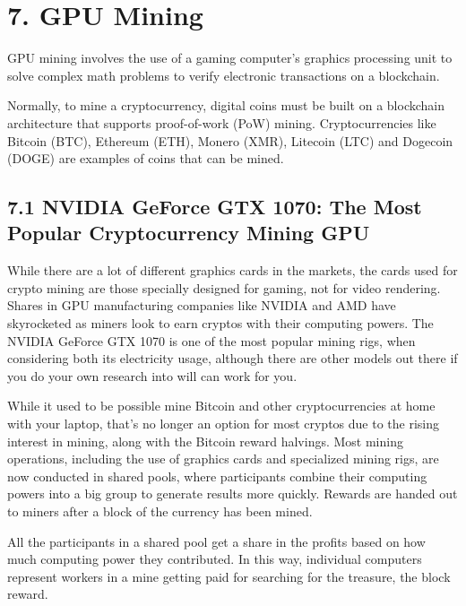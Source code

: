 \section*{7. GPU Mining}
GPU mining involves the use of a gaming computer’s graphics processing unit to solve complex math problems to verify electronic transactions on a blockchain.\vspace{.3 cm}

Normally, to mine a cryptocurrency, digital coins must be built on a blockchain architecture that supports proof-of-work (PoW) mining. Cryptocurrencies like Bitcoin (BTC), Ethereum (ETH), Monero (XMR), Litecoin (LTC) and Dogecoin (DOGE) are examples of coins that can be mined.\vspace{.3 cm}

\subsection*{7.1 NVIDIA GeForce GTX 1070: The Most Popular Cryptocurrency Mining GPU}
While there are a lot of different graphics cards in the markets, the cards used for crypto mining are those specially designed for gaming, not for video rendering. Shares in GPU manufacturing companies like NVIDIA and AMD have skyrocketed as miners look to earn cryptos with their computing powers. The NVIDIA GeForce GTX 1070 is one of the most popular mining rigs, when considering both its electricity usage, although there are other models out there if you do your own research into will can work for you.\vspace{.3 cm}

While it used to be possible mine Bitcoin and other cryptocurrencies at home with your laptop, that's no longer an option for most cryptos due to the rising interest in mining, along with the Bitcoin reward halvings. Most mining operations, including the use of graphics cards and specialized mining rigs, are now conducted in shared pools, where participants combine their computing powers into a big group to generate results more quickly. Rewards are handed out to miners after a block of the currency has been mined.\vspace{.3 cm}

All the participants in a shared pool get a share in the profits based on how much computing power they contributed. In this way, individual computers represent workers in a mine getting paid for searching for the treasure, the block reward.\vspace{.3 cm}

